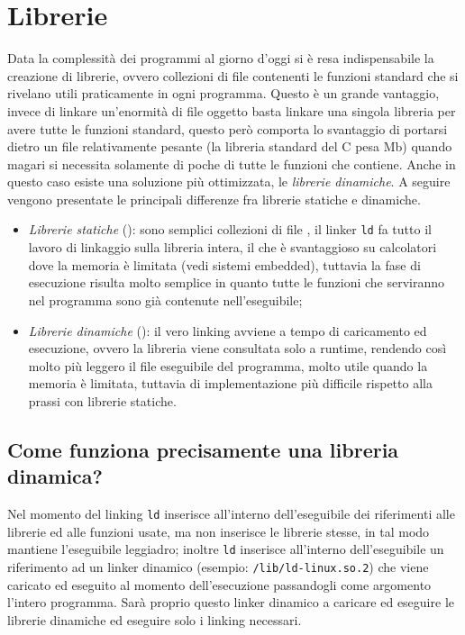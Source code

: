 \documentclass[class=book, crop=false, oneside]{standalone}
\begin{document}
\section{Librerie}
Data la complessità dei programmi al giorno d'oggi si è resa indispensabile la creazione di librerie, ovvero collezioni di file  contenenti le funzioni standard che si rivelano utili praticamente in ogni  programma.
Questo è un grande vantaggio, invece di linkare un'enormità di file oggetto basta linkare una singola libreria per avere tutte le funzioni standard, questo però comporta lo svantaggio di portarsi dietro un file relativamente pesante (la libreria standard del C pesa \unit[2,5]{Mb}) quando magari si necessita solamente di poche di tutte le funzioni che contiene.
Anche in questo caso esiste una soluzione più ottimizzata, le \emph{librerie dinamiche}. A seguire vengono presentate le principali differenze fra librerie statiche e dinamiche.
\begin{itemize}
	\item \emph{Librerie statiche} (): sono semplici collezioni di file , il linker \texttt{ld} fa tutto il lavoro di linkaggio sulla libreria intera, il che è svantaggioso su calcolatori dove la memoria è limitata (vedi sistemi embedded), tuttavia la fase di esecuzione risulta molto semplice in quanto tutte le funzioni che serviranno nel programma sono già contenute nell'eseguibile;
	\item \emph{Librerie dinamiche} (): il vero linking avviene a tempo di caricamento ed esecuzione, ovvero la libreria viene consultata solo a runtime, rendendo così molto più leggero il file eseguibile del programma, molto utile quando la memoria è limitata, tuttavia di implementazione più difficile rispetto alla prassi con librerie statiche.
\end{itemize}

\subsection{Come funziona precisamente una libreria dinamica?}
Nel momento del linking \texttt{ld} inserisce all'interno dell'eseguibile dei riferimenti alle librerie ed alle funzioni usate, ma non inserisce le librerie stesse, in tal modo mantiene l'eseguibile leggiadro; inoltre \texttt{ld} inserisce all'interno dell'eseguibile un riferimento ad un linker dinamico (esempio: \texttt{/lib/ld-linux.so.2}) che viene caricato ed eseguito al momento dell'esecuzione passandogli come argomento l'intero programma. Sarà proprio questo linker dinamico a caricare ed eseguire le librerie dinamiche ed eseguire solo i linking necessari.
\end{document}
